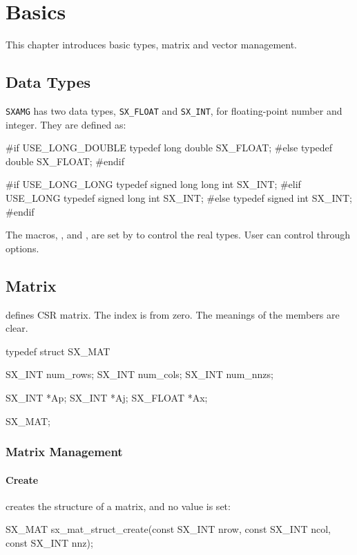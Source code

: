 
\chapter{Basics}

This chapter introduces basic types, matrix and vector management.

\section{Data Types}

\verb|SXAMG| has two data types, \verb|SX_FLOAT| and \verb|SX_INT|, for floating-point number
and integer. They are defined as:
\begin{evb}
#if USE_LONG_DOUBLE
typedef long double              SX_FLOAT;
#else
typedef double                   SX_FLOAT;
#endif

#if USE_LONG_LONG
typedef signed long long int     SX_INT;
#elif USE_LONG
typedef signed long int          SX_INT;
#else
typedef signed int               SX_INT;
#endif

\end{evb}

The macros, ,  and , are set by  to
control the real types. User can control through   options.

\section{Matrix}
 defines CSR matrix. The index is from zero. The meanings of the members are clear.
\begin{evb}
typedef struct SX_MAT
{
    SX_INT num_rows;
    SX_INT num_cols;
    SX_INT num_nnzs;

    SX_INT   *Ap;
    SX_INT   *Aj;
    SX_FLOAT *Ax;

} SX_MAT;
\end{evb}

\subsection{Matrix Management}

\subsubsection{Create}

 creates the structure of a matrix, and no value is set:
\begin{evb}
SX_MAT sx_mat_struct_create(const SX_INT nrow, const SX_INT ncol, const SX_INT nnz);
\end{evb}

